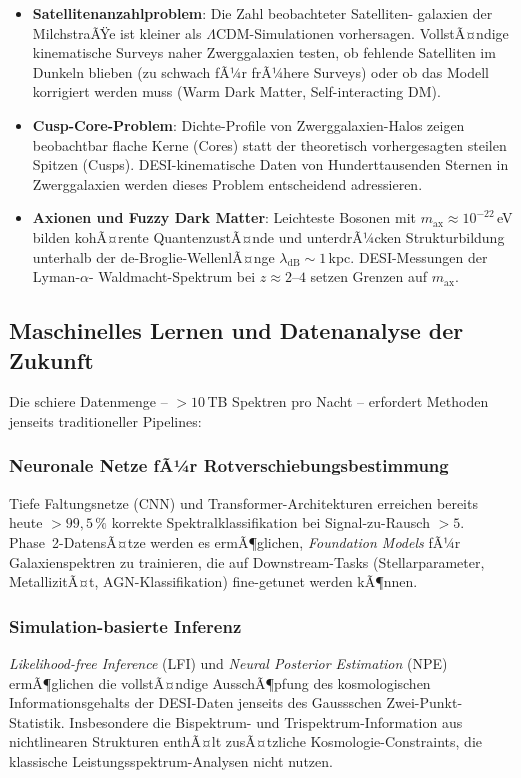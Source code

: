 ﻿\documentclass[a4paper,12pt]{article}
\theoremstyle{definition}
\theoremstyle{remark}
\begin{document}
\begin{itemize}
  \item \textbf{Satellitenanzahlproblem}: Die Zahl beobachteter Satelliten-
    galaxien der MilchstraÃŸe ist kleiner als $\Lambda$CDM-Simulationen vorhersagen.
    VollstÃ¤ndige kinematische Surveys naher Zwerggalaxien testen, ob fehlende
    Satelliten im Dunkeln blieben (zu schwach fÃ¼r frÃ¼here Surveys) oder ob
    das Modell korrigiert werden muss (Warm Dark Matter, Self-interacting DM).
  \item \textbf{Cusp-Core-Problem}: Dichte-Profile von Zwerggalaxien-Halos zeigen
    beobachtbar flache Kerne (Cores) statt der theoretisch vorhergesagten
    steilen Spitzen (Cusps). DESI-kinematische Daten von Hunderttausenden
    Sternen in Zwerggalaxien werden dieses Problem entscheidend adressieren.
  \item \textbf{Axionen und Fuzzy Dark Matter}: Leichteste Bosonen mit
    $m_\mathrm{ax} \approx 10^{-22}$\,eV bilden kohÃ¤rente QuantenzustÃ¤nde
    und unterdrÃ¼cken Strukturbildung unterhalb der de-Broglie-WellenlÃ¤nge
    $\lambda_\mathrm{dB} \sim 1$\,kpc. DESI-Messungen der Lyman-$\alpha$-
    Waldmacht-Spektrum bei $z \approx 2$--$4$ setzen Grenzen auf $m_\mathrm{ax}$.
\end{itemize}

\subsection{Maschinelles Lernen und Datenanalyse der Zukunft}

Die schiere Datenmenge -- $>10$\,TB Spektren pro Nacht -- erfordert
Methoden jenseits traditioneller Pipelines:

\subsubsection*{Neuronale Netze fÃ¼r Rotverschiebungsbestimmung}
Tiefe Faltungsnetze (CNN) und Transformer-Architekturen erreichen bereits heute
$> 99{,}5\,\%$ korrekte Spektralklassifikation bei Signal-zu-Rausch $> 5$.
Phase~2-DatensÃ¤tze werden es ermÃ¶glichen, \textit{Foundation Models} fÃ¼r
Galaxienspektren zu trainieren, die auf Downstream-Tasks (Stellarparameter,
MetallizitÃ¤t, AGN-Klassifikation) fine-getunet werden kÃ¶nnen.

\subsubsection*{Simulation-basierte Inferenz}
\textit{Likelihood-free Inference} (LFI) und \textit{Neural Posterior Estimation}
(NPE) ermÃ¶glichen die vollstÃ¤ndige AusschÃ¶pfung des kosmologischen
Informationsgehalts der DESI-Daten jenseits des Gaussschen Zwei-Punkt-Statistik.
Insbesondere die Bispektrum- und Trispektrum-Information aus nichtlinearen
Strukturen enthÃ¤lt zusÃ¤tzliche Kosmologie-Constraints, die klassische
Leistungsspektrum-Analysen nicht nutzen.
\end{document}
